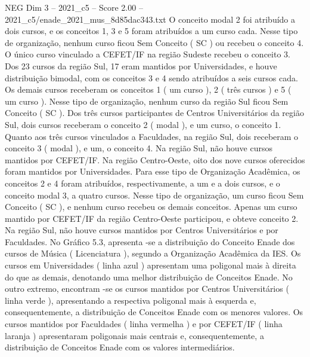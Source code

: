 \begin{textsample}{NEG Dim 3 – 2021\_c5 – Score 2.00 – 2021\_c5/enade\_2021\_mus\_8d85dac343.txt}
O conceito modal 2 foi atribuído a dois cursos, e os conceitos 1, 3 e 5 foram atribuídos a um curso cada.
Nesse tipo de organização, nenhum curso ficou Sem Conceito ( SC ) ou recebeu o conceito 4.
O único curso vinculado a CEFET/IF na região Sudeste recebeu o conceito 3.
Dos 23 cursos da região Sul, 17 eram mantidos por Universidades, e houve distribuição bimodal, com os conceitos 3 e 4 sendo atribuídos a seis cursos cada.
Os demais cursos receberam os conceitos 1 ( um curso ), 2 ( três cursos ) e 5 ( um curso ).
Nesse tipo de organização, nenhum curso da região Sul ficou Sem Conceito ( SC ).
Dos três cursos participantes de Centros Universitários da região Sul, dois cursos receberam o conceito 2 ( modal ), e um curso, o conceito 1.
Quanto aos três cursos vinculados a Faculdades, na região Sul, dois receberam o conceito 3 ( modal ), e um, o conceito 4.
Na região Sul, não houve cursos mantidos por CEFET/IF.
Na região Centro-Oeste, oito dos nove cursos oferecidos foram mantidos por Universidades.
Para esse tipo de Organização Acadêmica, os conceitos 2 e 4 foram atribuídos, respectivamente, a um e a dois cursos, e o conceito modal 3, a quatro cursos.
Nesse tipo de organização, um curso ficou Sem Conceito ( SC ), e nenhum curso recebeu os demais conceitos.
Apenas um curso mantido por CEFET/IF da região Centro-Oeste participou, e obteve conceito 2.
Na região Sul, não houve cursos mantidos por Centros Universitários e por Faculdades.
No Gráfico 5.3, apresenta -se a distribuição do Conceito Enade dos cursos de Música ( Licenciatura ), segundo a Organização Acadêmica da IES.
Os cursos em Universidades ( linha azul ) apresentam uma poligonal mais à direita do que as demais, denotando uma melhor distribuição de Conceitos Enade.
No outro extremo, encontram -se os cursos mantidos por Centros Universitários ( linha verde ), apresentando a respectiva poligonal mais à esquerda e, consequentemente, a distribuição de Conceitos Enade com os menores valores.
Os cursos mantidos por Faculdades ( linha vermelha ) e por CEFET/IF ( linha laranja ) apresentaram poligonais mais centrais e, consequentemente, a distribuição de Conceitos Enade com os valores intermediários.

\end{textsample}
